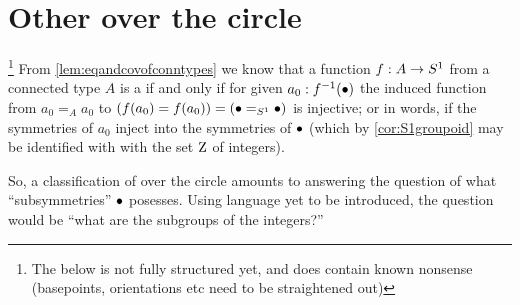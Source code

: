 


\section{Other \coverings over the circle}
\label{sec:covS1}

\footnote{The below is not fully structured yet, and does contain known nonsense (basepoints, orientations etc need to be straightened out)}
From \cref{lem:eqandcovofconntypes} we know that a function $f:A\to S^1$ from a connected type $A$ is a \covering if and only if for given $a_0:f^{-1}(\bullet)$ the induced function from $a_0=_Aa_0$ to $(f(a_0)=f(a_0))=(\bullet=_{S^1}\bullet)$ is injective; or in words, if the symmetries of $a_0$ inject into the symmetries of $\bullet$ (which by \cref{cor:S1groupoid} may be identified with with the set $\mathrm{Z}$ of integers).

So, a classification of \coverings over the circle amounts to answering the question of what ``subsymmetries'' $\bullet$ posesses.  Using language yet to be introduced, the question would be ``what are the subgroups of the integers?''

